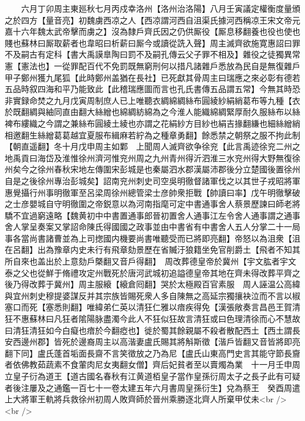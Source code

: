 　　六月丁卯周主東廵秋七月丙戍幸洛州【洛州治洛陽】八月壬寅議定權衡度量頒之於四方【量音亮】初魏虜西凉之人【西凉謂河西自沮渠氏據河西稱凉王宋文帝元嘉十六年魏太武帝擊而虜之】沒為隸戶齊氏因之仍供厮役【厮息移翻養也役也使也賤也蘇林曰厮取薪者也韋昭曰析薪曰厮今或讀從詵入聲】周主滅齊欲施寛惠詔曰罪不及嗣古有定科【書大禹謨臯陶曰罰不及嗣孔傳云父子罪不相及】雜役之徒獨異常憲【憲法也】一從罪配百代不免罰既無窮刑何以措凡諸雜戶悉放為民自是無復雜戶甲子鄭州獲九尾狐【此時鄭州盖猶在長社】已死獻其骨周主曰瑞應之來必彰有德若五品時叙四海和平乃能致此【此稽瑞應圖而言也孔氏書傳五品謂五常】今無其時恐非實録命焚之九月戊寅周制庶人已上唯聽衣綢綿綢絲布圓綾紗絹綃葛布等九種【衣於既翻綢與紬同直由翻大絲繒也綿綢紡綿為之今淮人能織綿綢緊厚耐久服絲布以絲裨布縷織之今謂之兼絲布圓綾土綾也亦謂之花絹紗方目紗也絹吉掾翻縑也細絲繒綃相邀翻生絲繒葛葛越宜夏服布緝麻若紵為之種章勇翻】餘悉禁之朝祭之服不拘此制【朝直遥翻】冬十月戊申周主如鄴　上聞周人滅齊欲争徐兖【此言禹迹徐兖二州之地禹貢曰海岱及淮惟徐州濟河惟兖州周之九州青州得沂泗淮三水兖州得大野無復徐州矣今之徐州春秋宋地左傳圍宋彭城是也秦屬泗水郡漢屬沛郡後分立楚國後置徐州自是之後徐州專治彭城矣】詔南兖州刺史司空吳明徹督諸軍伐之以其世子戎昭將軍惠覺攝行州事明徹軍至呂梁周徐州總管梁士彦帥衆拒戰【帥讀曰率】戊午明徹擊破之士彦嬰城自守明徹圍之帝鋭意以為河南指麾可定中書通事舍人蔡景歷諫曰師老將驕不宜過窮遠略【魏黄初中中書置通事郎晉初置舍人通事江左令舍人通事謂之通事舍人掌呈奏案又掌詔命陳氏得國國之政事並由中書省有中書舍人五人分掌二十一局事各當尚書諸曹並為上司揔國内機要尚書唯聽受而已將即亮翻】帝怒以為沮衆【沮在呂翻】出為豫章内史未行有飛章劾景歷在省贓汙狼籍坐免官削爵土【飛者不知其所自來也盖出於上意劾戶槩翻又音戶得翻】　周改葬德皇帝於冀州【宇文肱者宇文泰之父也從鮮于脩禮攻定州戰死於唐河武城初追謚德皇帝其地在齊未得改葬平齊之後乃得改葬于冀州】周主服縗【縗倉囘翻】哭於太極殿百官素服　周人誣温公高緯與宜州刺史穆提婆謀反并其宗族皆賜死衆人多自陳無之高延宗獨攘袂泣而不言以椒塞口而死【塞悉則翻】唯緯弟仁英以清狂仁雅以瘖疾得免【漢張敞奏言昌邑王賀清狂不惠蘇林曰凡狂者隂陽脉盡濁今此人不狂似狂故言清狂或曰色理清徐而心不慧故曰清狂清狂如今白癡也瘖於今翻瘂也】徙於蜀其餘親屬不殺者散配西土【西土謂長安西邊州郡】皆死於邊裔周主以高湝妻盧氏賜其將斛斯徵【湝戶皆翻又音皆將即亮翻下同】盧氏蓬首垢面長齋不言笑徵放之乃為尼【盧氏山東高門史言其能守節長齎者依佛教茹蔬素不食葷肉尼女夷翻女僧】齊后妃貧者至以賣燭為業　十一月壬申周立皇子衍為道王【道古國名春秋有江黄道栢皇子當作皇孫衍周太子之長子此有可疑者後注屢及之通鑑一百七十一卷太建五年六月書周皇孫衍生】兌為蔡王　癸酉周遣上大將軍王軌將兵救徐州初周人敗齊師於晉州乘勝逐北齊人所棄甲仗未<br />
<br />

